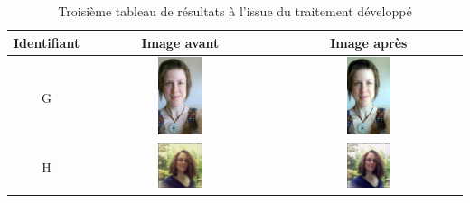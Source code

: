 \documentclass[11pt, french,screen]{report-rd-info}
\begin{document}
\begin{table}
\centering
\begin{tabular}{|c|c|c|}	
   \hline \textbf{Identifiant}  &  \textbf{Image avant}  &  \textbf{Image après} \\ \hline 
   G & \includegraphics[width=0.25\textwidth]{Resultats/pg_avant} & \includegraphics[width=0.25\textwidth]{Resultats/pg_apres} \\ \hline
   H & \includegraphics[width=0.25\textwidth]{Resultats/ph_avant} & \includegraphics[width=0.25\textwidth]{Resultats/ph_apres} \\ \hline   
\end{tabular}
\caption{Troisième tableau de résultats à l'issue du traitement développé}
\label{tab:Resultats3}
\end{table}
\end{document}
